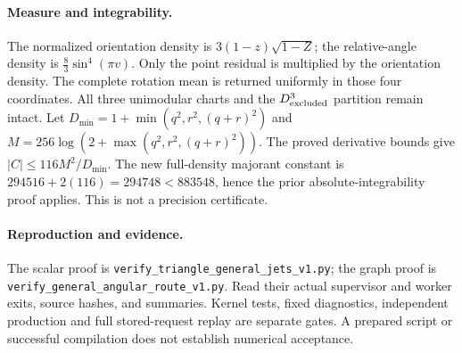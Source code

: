 \documentclass[11pt]{article}
\begin{document}
\paragraph{Measure and integrability.}
The normalized orientation density is $3(1-z)\sqrt{1-Z}$; the relative-angle density is $\frac83\sin^4(\pi v)$.
Only the point residual is multiplied by the orientation density. The complete rotation mean is returned uniformly in those four coordinates.
All three unimodular charts and the $D_{\rm excluded}^3$ partition remain intact.
Let $D_{\min}=1+\min(q^2,r^2,(q+r)^2)$ and $M=256\log(2+\max(q^2,r^2,(q+r)^2))$.
The proved derivative bounds give $|C|\leq116M^2/D_{\min}$.
The new full-density majorant constant is
$294516+2(116)=294748<883548$, hence the prior absolute-integrability proof applies.
This is not a precision certificate.

\paragraph{Reproduction and evidence.}
The scalar proof is \texttt{verify\_triangle\_general\_jets\_v1.py};
the graph proof is \texttt{verify\_general\_angular\_route\_v1.py}.
Read their actual supervisor and worker exits, source hashes, and summaries.
Kernel tests, fixed diagnostics, independent production and full stored-request replay are separate gates. A prepared script or successful compilation does not establish numerical acceptance.
\end{document}
